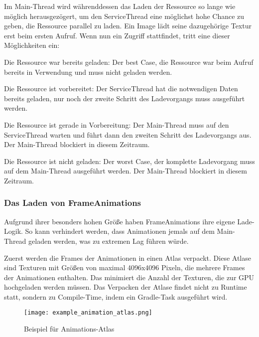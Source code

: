 Im Main-Thread wird währenddessen das Laden der Ressource so lange wie möglich herausgezögert, um den ServiceThread
eine möglichst hohe Chance zu geben, die Ressource parallel zu laden.
Ein Image \zB lädt seine dazugehörige Textur erst beim ersten  Aufruf.
Wenn nun ein Zugriff stattfindet, tritt eine dieser Möglichkeiten ein:

\begin{liste}
    \item Die Ressource war bereits geladen: Der best Case, die Ressource war beim  Aufruf bereits
        in Verwendung und muss nicht geladen werden.
    \item Die Ressource ist vorbereitet: Der ServiceThread hat die notwendigen Daten bereits geladen, nur noch der
        zweite Schritt des Ladevorgangs muss ausgeführt werden.
    \item Die Ressource ist gerade in Vorbereitung: Der Main-Thread muss auf den ServiceThread warten und führt dann
        den zweiten Schritt des Ladevorgangs aus.
        Der Main-Thread blockiert in diesem Zeitraum.
    \item Die Ressource ist nicht geladen: Der worst Case, der komplette Ladevorgang muss auf dem Main-Thread ausgeführt
        werden.
        Der Main-Thread blockiert in diesem Zeitraum.
\end{liste}

\subsubsection{Das Laden von FrameAnimations}

Aufgrund ihrer besonders hohen Größe haben FrameAnimations ihre eigene Lade-Logik.
So kann verhindert werden, dass Animationen jemals auf dem Main-Thread geladen werden, was zu extremen Lag führen würde.

Zuerst werden die Frames der Animationen in einen Atlas verpackt.
Diese Atlase sind Texturen mit Größen von maximal 4096x4096 Pixeln, die mehrere Frames der Animationen enthalten.
Das minimiert die Anzahl der Texturen, die zur GPU hochgeladen werden müssen.
Das Verpacken der Atlase findet nicht zu Runtime statt, sondern zu Compile-Time, indem ein Gradle-Task ausgeführt wird.

\begin{figure}[H]
    \centering
    \texttt{[image: example\_animation\_atlas.png]}
    \caption{Beispiel für Animations-Atlas}
\end{figure}

